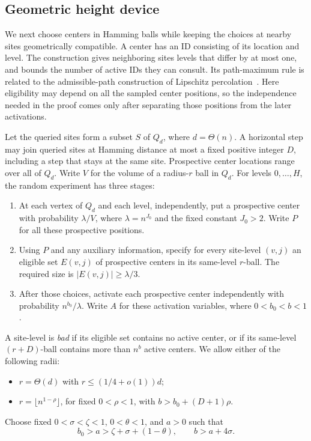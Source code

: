 \subsection{Geometric height device}
\label{sec:geometric-height-device}

We next choose centers in Hamming balls while keeping the choices at
nearby sites geometrically compatible. A center has an ID consisting of
its location and level. The construction gives neighboring sites levels
that differ by at most one, and bounds the number of active IDs they can
consult. Its path-maximum rule is related to the admissible-path
construction of Lipschitz percolation~\cite[Sections~4--5]{dirr-dondl-grimmett-holroyd-scheutzow2010}.
Here eligibility may depend on all the sampled center positions, so the
independence needed in the proof comes only after separating those
positions from the later activations.

Let the queried sites form a subset \(S\) of \(Q_d\), where
\(d=\Theta(n)\). A horizontal step may join queried sites at Hamming
distance at most a fixed positive integer \(D\), including a step that
stays at the same site. Prospective center locations range over all of
\(Q_d\). Write \(V\) for the volume of a radius-\(r\) ball in \(Q_d\).
For levels \(0,\ldots,H\), the random experiment has three stages:
\begin{enumerate}[label=(\roman*),leftmargin=*]
\item At each vertex of \(Q_d\) and each level, independently, put a
prospective center with probability \(\lambda/V\), where
\(\lambda=n^{J_0}\) and the fixed constant \(J_0>2\). Write \(P\) for
all these prospective positions.
\item Using \(P\) and any auxiliary information, specify for every
site-level \((v,j)\) an eligible set \(E(v,j)\) of prospective centers in
its same-level \(r\)-ball. The required size is \(|E(v,j)|\ge\lambda/3\).
\item After those choices, activate each prospective center independently
with probability \(n^{b_0}/\lambda\). Write \(A\) for these activation
variables, where \(0<b_0<b<1\).
\end{enumerate}
A site-level is \emph{bad} if its eligible set contains no active center,
or if its same-level \((r+D)\)-ball contains more than \(n^b\) active
centers. We allow either of the following radii:
\begin{itemize}
\item \(r=\Theta(d)\) with \(r\le(1/4+o(1))d\);
\item \(r=\lfloor n^{1-\rho}\rfloor\), for fixed \(0<\rho<1\), with
\(b>b_0+(D+1)\rho\).
\end{itemize}
Choose fixed \(0<\sigma<\zeta<1\), \(0<\theta<1\), and \(a>0\) such that
\[
 b_0>a>\zeta+\sigma+(1-\theta),\qquad b>a+4\sigma.
\]

